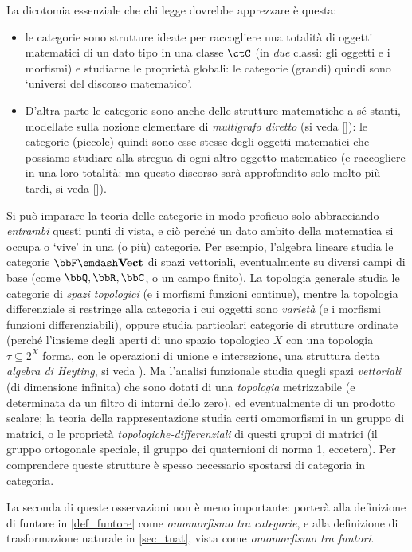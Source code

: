 La dicotomia essenziale che chi legge dovrebbe apprezzare è questa:
\begin{itemize}
	\item le categorie sono strutture ideate per raccogliere una totalità di oggetti matematici di un dato tipo in una classe \(\ctC\) (in \emph{due} classi: gli oggetti e i morfismi) e studiarne le proprietà globali: le categorie (grandi) quindi sono `universi del discorso matematico'.
	\item D'altra parte le categorie sono anche delle strutture matematiche a sé stanti, modellate sulla nozione elementare di \emph{multigrafo diretto} (si veda \ref{}): le categorie (piccole) quindi sono esse stesse degli oggetti matematici che possiamo studiare alla stregua di ogni altro oggetto matematico (e raccogliere in una loro totalità: ma questo discorso sarà approfondito solo molto più tardi, si veda \ref{}).
\end{itemize}
Si può imparare la teoria delle categorie in modo proficuo solo abbracciando \emph{entrambi} questi punti di vista, e ciò perché un dato ambito della matematica si occupa o `vive' in una (o più) categorie. Per esempio, l'algebra lineare studia le categorie \(\bbF\emdash\ctVect\) di spazi vettoriali, eventualmente su diversi campi di base (come $\bbQ,\bbR,\bbC$, o un campo finito). La topologia generale studia le categorie di \emph{spazi topologici} (e i morfismi funzioni continue), mentre la topologia differenziale si restringe alla categoria i cui oggetti sono \emph{varietà} (e i morfismi funzioni differenziabili), oppure studia particolari categorie di strutture ordinate (perché l'insieme degli aperti di uno spazio topologico \(X\) con una topologia \(\tau \subseteq 2^X\) forma, con le operazioni di unione e intersezione, una struttura detta \emph{algebra di Heyting}, si veda \cite{}). Ma l'analisi funzionale studia quegli spazi \emph{vettoriali} (di dimensione infinita) che sono dotati di una \emph{topologia} metrizzabile (e determinata da un filtro di intorni dello zero), ed eventualmente di un prodotto scalare; la teoria della rappresentazione studia certi omomorfismi in un gruppo di matrici, o le proprietà \emph{topologiche-differenziali} di questi gruppi di matrici (il gruppo ortogonale speciale, il gruppo dei quaternioni di norma 1, eccetera). Per comprendere queste strutture è spesso necessario spostarsi di categoria in categoria.

La seconda di queste osservazioni non è meno importante: porterà alla definizione di funtore in \ref{def_funtore} come \emph{omomorfismo tra categorie}, e alla definizione di trasformazione naturale in \ref{sec_tnat}, vista come \emph{omomorfismo tra funtori}.

